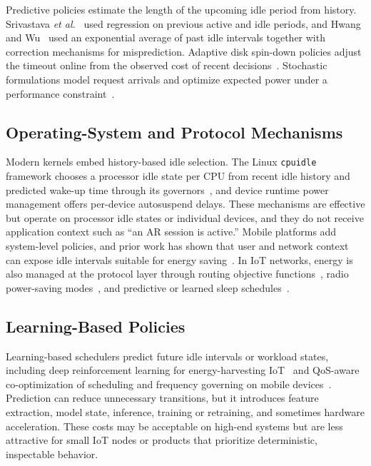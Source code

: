 \documentclass[journal]{IEEEtran}
\begin{document}
Predictive policies estimate the length of the upcoming idle period from history. Srivastava \emph{et al.}~\cite{srivastava1996predictive} used regression on previous active and idle periods, and Hwang and Wu~\cite{hwang2000predictive} used an exponential average of past idle intervals together with correction mechanisms for misprediction. Adaptive disk spin-down policies adjust the timeout online from the observed cost of recent decisions~\cite{douglis1995adaptive,helmbold1996dynamic}. Stochastic formulations model request arrivals and optimize expected power under a performance constraint~\cite{simunic2001event}.

\subsection{Operating-System and Protocol Mechanisms}
Modern kernels embed history-based idle selection. The Linux \texttt{cpuidle} framework chooses a processor idle state per CPU from recent idle history and predicted wake-up time through its governors~\cite{pallipadi2007cpuidle}, and device runtime power management offers per-device autosuspend delays. These mechanisms are effective but operate on processor idle states or individual devices, and they do not receive application context such as ``an AR session is active.'' Mobile platforms add system-level policies, and prior work has shown that user and network context can expose idle intervals suitable for energy saving~\cite{pefkianakis2014idle,kim2012diapause}. In IoT networks, energy is also managed at the protocol layer through routing objective functions~\cite{safaei2021elite}, radio power-saving modes~\cite{michelinakis2021nbiot}, and predictive or learned sleep schedules~\cite{eaps2022,ruiz2026wakeup}.

\subsection{Learning-Based Policies}
Learning-based schedulers predict future idle intervals or workload states, including deep reinforcement learning for energy-harvesting IoT~\cite{ko2025rass} and QoS-aware co-optimization of scheduling and frequency governing on mobile devices~\cite{sang2024qos}. Prediction can reduce unnecessary transitions, but it introduces feature extraction, model state, inference, training or retraining, and sometimes hardware acceleration. These costs may be acceptable on high-end systems but are less attractive for small IoT nodes or products that prioritize deterministic, inspectable behavior.
\end{document}
